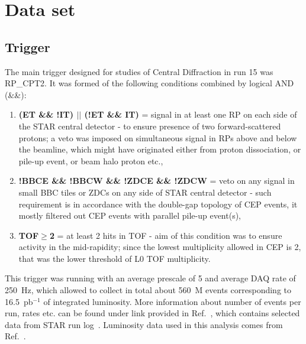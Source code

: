 

\chapter{Data set}\label{chap:dataset}

\section{Trigger}\label{seq:trigger}

The main trigger designed for studies of Central Diffraction in run 15 was RP\_CPT2. It was formed of the following conditions combined by logical AND (\&\&):
\begin{enumerate}
 \item \textbf{(ET \&\& !IT) $||$ (!ET \&\& IT)} = signal in at least one RP on each side of the STAR central detector - to ensure presence of two forward-scattered protons; a veto was imposed on simultaneous signal in RPs above and below the beamline, which might have originated either from proton dissociation, or pile-up event, or beam halo proton etc.,
 \item \textbf{!BBCE \&\& !BBCW \&\& !ZDCE \&\& !ZDCW} = veto on any signal in small BBC tiles or ZDCs on any side of STAR central detector - such requirement is in accordance with the double-gap topology of CEP events, it mostly filtered out CEP events with parallel pile-up event(s),
 \item \textbf{TOF$\geq$2} = at least 2 hits in TOF - aim of this condition was to ensure activity in the mid-rapidity; since the lowest multiplicity allowed in CEP is 2, that was the lower threshold of L0 TOF multiplicity.
\end{enumerate}%
This trigger was running with an average prescale of 5 and average DAQ rate of 250~Hz, which allowed to collect in total about 560~M events corresponding to 16.5~pb$^{-1}$ of integrated luminosity.  More information about number of events per run, rates etc. can be found under link provided in Ref.~\cite{onlineRpTriggersMonitoring}, which contains selected data from STAR run log~\cite{RunLog}. Luminosity data used in this analysis comes from Ref.~\cite{Luminosity}.

